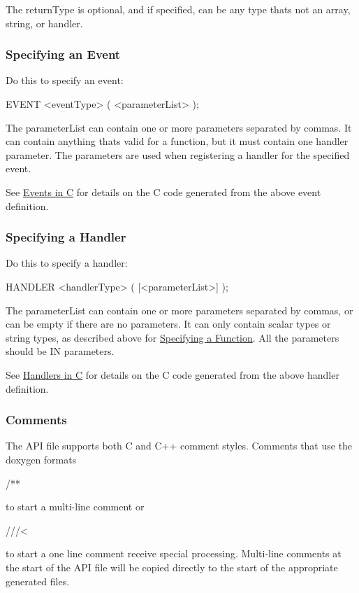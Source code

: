 The {\ttfamily return\+Type} is optional, and if specified, can be any type that\textquotesingle{}s not an array, string, or handler.\hypertarget{interface_def_lang_syntax_interfaceDefLangSyntax_event}{}\subsubsection{Specifying an Event}\label{interface_def_lang_syntax_interfaceDefLangSyntax_event}
Do this to specify an event\+:

\begin{DoxyVerb}EVENT <eventType>
(
    <parameterList>
);
\end{DoxyVerb}


The {\ttfamily parameter\+List} can contain one or more parameters separated by commas. It can contain anything that\textquotesingle{}s valid for a function, but it must contain one handler parameter. The parameters are used when registering a handler for the specified event.

See \hyperlink{interface_def_lang_c_interfaceDefLangC_event}{Events in C} for details on the C code generated from the above event definition.\hypertarget{interface_def_lang_syntax_interfaceDefLangSyntax_handler}{}\subsubsection{Specifying a Handler}\label{interface_def_lang_syntax_interfaceDefLangSyntax_handler}
Do this to specify a handler\+:

\begin{DoxyVerb}HANDLER <handlerType>
(
    [<parameterList>]
);
\end{DoxyVerb}


The {\ttfamily parameter\+List} can contain one or more parameters separated by commas, or can be empty if there are no parameters. It can only contain scalar types or string types, as described above for \hyperlink{interface_def_lang_syntax_interfaceDefLangSyntax_function}{Specifying a Function}. All the parameters should be I\+N parameters.

See \hyperlink{interface_def_lang_c_interfaceDefLangC_handler}{Handlers in C} for details on the C code generated from the above handler definition.\hypertarget{interface_def_lang_syntax_interfaceDefLangSyntax_comments}{}\subsubsection{Comments}\label{interface_def_lang_syntax_interfaceDefLangSyntax_comments}
The A\+P\+I file supports both C and C++ comment styles. Comments that use the doxygen formats \begin{DoxyVerb}/** \end{DoxyVerb}
 to start a multi-\/line comment or\begin{DoxyVerb}///< \end{DoxyVerb}
 to start a one line comment receive special processing. Multi-\/line comments at the start of the A\+P\+I file will be copied directly to the start of the appropriate generated files.

